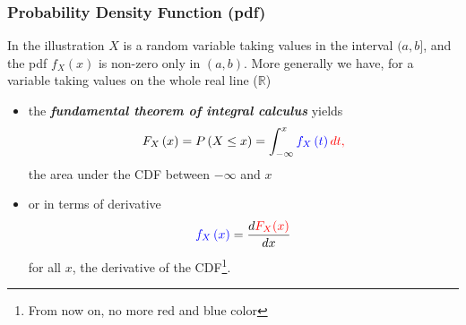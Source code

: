 \documentclass[notes=show,smaller,handout]{beamer}
\renewcommand{\Pr}{P}
\newenvironment{stepitemize}{\begin{itemize}[<+->]}{\end{itemize} }
\begin{document}
\begin{frame}%

\frametitle{Probability Density Function (pdf)}

In the illustration $X$ is a random variable taking values in the interval $(a,b]$, and the pdf $f_{X}\left( x\right) $ is non-zero only in $(a,b)$. More generally we have, for a variable taking values on the whole real line ($\mathbb{R}$) \vspace{0.3cm}
\begin{stepitemize}
\item the \textbf{\emph{fundamental theorem of integral calculus}} yields
\color{red}
$$F_{X}\left( x\right) =\Pr \left( X\leq x\right) =\int_{-\infty}^{x}\color{blue}f_{X}\left(
t\right)\color{red} dt,$$%
\color{black}
the area under the CDF between $-\infty$ and $x$ \vspace{0.3cm}

\item or in terms of derivative
$$
\color{blue}f_{X}\left( x\right) \color{black} = \frac{d\color{red}F_{X}(x) \color{black}}{\color{black} dx}
$$ 
for all $x$, the derivative of the CDF\footnote{From now on, no more red and blue color}.
\end{stepitemize}




\end{frame}%
\end{document}

